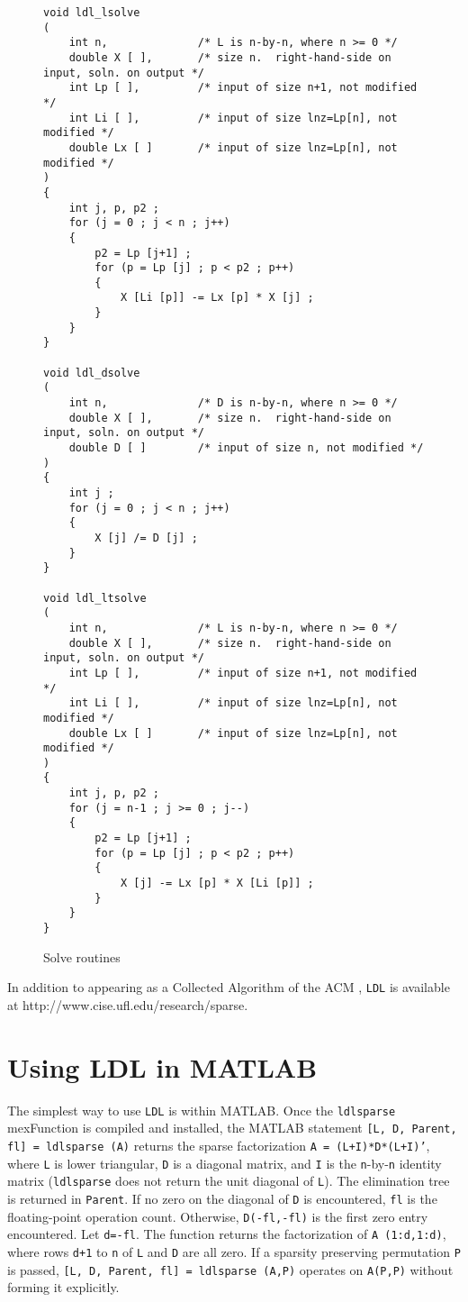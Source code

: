 \documentclass[12pt]{article}
\begin{document}
\begin{figure}
\caption{Solve routines}
\label{ldlsolve}
{\scriptsize
\begin{verbatim}
void ldl_lsolve
(
    int n,              /* L is n-by-n, where n >= 0 */
    double X [ ],       /* size n.  right-hand-side on input, soln. on output */
    int Lp [ ],         /* input of size n+1, not modified */
    int Li [ ],         /* input of size lnz=Lp[n], not modified */
    double Lx [ ]       /* input of size lnz=Lp[n], not modified */
)
{
    int j, p, p2 ;
    for (j = 0 ; j < n ; j++)
    {
        p2 = Lp [j+1] ;
        for (p = Lp [j] ; p < p2 ; p++)
        {
            X [Li [p]] -= Lx [p] * X [j] ;
        }
    }
}

void ldl_dsolve
(
    int n,              /* D is n-by-n, where n >= 0 */
    double X [ ],       /* size n.  right-hand-side on input, soln. on output */
    double D [ ]        /* input of size n, not modified */
)
{
    int j ;
    for (j = 0 ; j < n ; j++)
    {
        X [j] /= D [j] ;
    }
}

void ldl_ltsolve
(
    int n,              /* L is n-by-n, where n >= 0 */
    double X [ ],       /* size n.  right-hand-side on input, soln. on output */
    int Lp [ ],         /* input of size n+1, not modified */
    int Li [ ],         /* input of size lnz=Lp[n], not modified */
    double Lx [ ]       /* input of size lnz=Lp[n], not modified */
)
{
    int j, p, p2 ;
    for (j = n-1 ; j >= 0 ; j--)
    {
        p2 = Lp [j+1] ;
        for (p = Lp [j] ; p < p2 ; p++)
        {
            X [j] -= Lx [p] * X [Li [p]] ;
        }
    }
}
\end{verbatim}
}
\end{figure}

In addition to appearing as a Collected Algorithm of the ACM \cite{Davis05},
{\tt LDL} is available at http://www.cise.ufl.edu/research/sparse.

\section{Using LDL in MATLAB}
\label{MATLAB}

The simplest way to use {\tt LDL} is within MATLAB.  Once the {\tt ldlsparse}
mexFunction is compiled and installed, the MATLAB statement
{\tt [L, D, Parent, fl] = ldlsparse (A)} returns the sparse factorization
{\tt A = (L+I)*D*(L+I)'}, where {\tt L} is lower triangular, {\tt D} is a
diagonal matrix, and {\tt I} is the {\tt n}-by-{\tt n}
identity matrix ({\tt ldlsparse} does not return the unit diagonal of {\tt L}).
The elimination tree is returned in {\tt Parent}.
If no zero on the diagonal of {\tt D} is encountered, {\tt fl} is the
floating-point operation count.  Otherwise, {\tt D(-fl,-fl)} is the first
zero entry encountered.  Let {\tt d=-fl}.  The function returns the
factorization of {\tt A (1:d,1:d)}, where rows {\tt d+1} to {\tt n} of {\tt L}
and {\tt D} are all zero.  If a sparsity preserving permutation {\tt P} is
passed, {\tt [L, D, Parent, fl] = ldlsparse (A,P)}
operates on {\tt A(P,P)} without
forming it explicitly.
\end{document}
